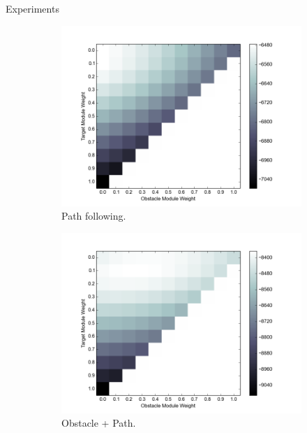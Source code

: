 \documentclass[final]{beamer}
\begin{document}
\begin{frame}{}
\begin{textblock}{37}
\begin{block}{Experiments}
\begin{figure}[h]
\centering
\begin{subfigure}[b]{0.24\textwidth}
\includegraphics[width=\textwidth]{objValuesTask1.png}
\caption{Path following.}
\end{subfigure}
\begin{subfigure}[b]{0.24\textwidth}
\includegraphics[width=\textwidth]{objValuesTask2.png}
\caption{Obstacle + Path. }
\end{subfigure}
\begin{subfigure}[b]{0.24\textwidth}

\end{subfigure}
\end{figure}
\end{block}
\end{textblock}
\end{frame}
\end{document}
